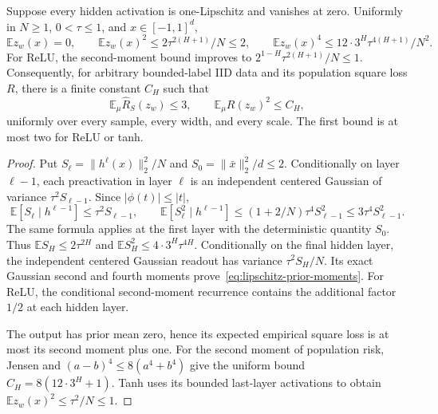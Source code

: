 \begin{lemma}
\label{lem:lipschitz-prior-moments}
Suppose every hidden activation is one-Lipschitz and vanishes at zero.
Uniformly in $N\geq1$, $0<\tau\leq1$, and $x\in[-1,1]^d$,
\begin{equation}
 \mathbb E z_w(x)=0,\qquad
 \mathbb E z_w(x)^2\leq2\tau^{2(H+1)}/N\leq2,
 \qquad
 \mathbb E z_w(x)^4\leq12\cdot3^H\tau^{4(H+1)}/N^2.
 \label{eq:lipschitz-prior-moments}
\end{equation}
For ReLU, the second-moment bound improves to
$2^{1-H}\tau^{2(H+1)}/N\leq1$.
Consequently, for arbitrary bounded-label IID data and its population
square loss $R$, there is a finite constant $C_H$ such that
\[
 \mathbb E_\mu\widehat R_S(z_w)\leq3,
 \qquad \mathbb E_\mu R(z_w)^2\leq C_H,
\]
uniformly over every sample, every width, and every scale.
The first bound is at most two for ReLU or tanh.
\end{lemma}
\begin{proof}
Put $S_\ell=\|h^\ell(x)\|_2^2/N$ and
$S_0=\|\bar x\|_2^2/d\leq2$.
Conditionally on layer $\ell-1$, each preactivation in layer $\ell$
is an independent centered Gaussian of variance
$\tau^2S_{\ell-1}$.  Since $|\phi(t)|\leq|t|$,
\[
 \mathbb E[S_\ell\mid h^{\ell-1}]\leq\tau^2S_{\ell-1},\qquad
 \mathbb E[S_\ell^2\mid h^{\ell-1}]
       \leq(1+2/N)\tau^4S_{\ell-1}^2
       \leq3\tau^4S_{\ell-1}^2.
\]
The same formula applies at the first layer with the deterministic
quantity $S_0$.  Thus
$\mathbb E S_H\leq2\tau^{2H}$ and
$\mathbb E S_H^2\leq4\cdot3^H\tau^{4H}$.
Conditionally on the final hidden layer, the independent centered
Gaussian readout has variance $\tau^2S_H/N$.  Its exact Gaussian
second and fourth moments prove~\eqref{eq:lipschitz-prior-moments}.
For ReLU, the conditional second-moment recurrence contains the
additional factor $1/2$ at each hidden layer.

The output has prior mean zero, hence its expected empirical square
loss is at most its second moment plus one.  For the second moment
of population risk, Jensen and
$(a-b)^4\leq8(a^4+b^4)$ give the uniform bound
$C_H=8(12\cdot3^H+1)$.  Tanh uses its bounded last-layer activations
to obtain $\mathbb E z_w(x)^2\leq\tau^2/N\leq1$.
\end{proof}
